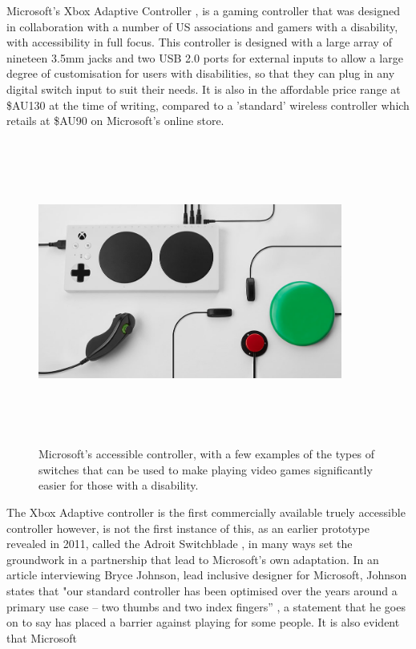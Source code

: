 Microsoft's Xbox Adaptive Controller \cite{adaptive}, is a gaming controller that was designed in collaboration with a number of US associations and gamers with a disability, with accessibility in full focus.
This controller is designed with a large array of nineteen 3.5mm jacks and two USB 2.0 ports for external inputs \cite{adaptive} to allow a large degree of customisation for users with disabilities, so that they can plug in any digital switch input to suit their needs.
It is also in the affordable price range at \$AU130 \cite{accessiblecontroller} at the time of writing, compared to a 'standard' wireless controller which retails at \$AU90 \cite{standardcontroller} on Microsoft's online store.

\begin{figure} [h]
    \centering
    \includegraphics[width=10cm,height=10cm,keepaspectratio]{Figures/accessible_controller.png}
    \caption{Microsoft's accessible controller, with a few examples of the types of switches that can be used to make playing video games significantly easier for those with a disability.}
    \label{fig:Jellybean}
\end{figure}

The Xbox Adaptive controller is the first commercially available truely accessible controller however, is not the first instance of this, as an earlier prototype revealed in 2011, called the Adroit Switchblade \cite{ablegamer}, in many ways set the groundwork in a partnership that lead to Microsoft's own adaptation.
In an article interviewing Bryce Johnson, lead inclusive designer for Microsoft, Johnson states that "our standard controller has been optimised over the years around a primary use case – two thumbs and two index fingers” \cite{disabilitygaming}, a statement that he goes on to say has placed a barrier against playing for some people.
It is also evident that Microsoft %

